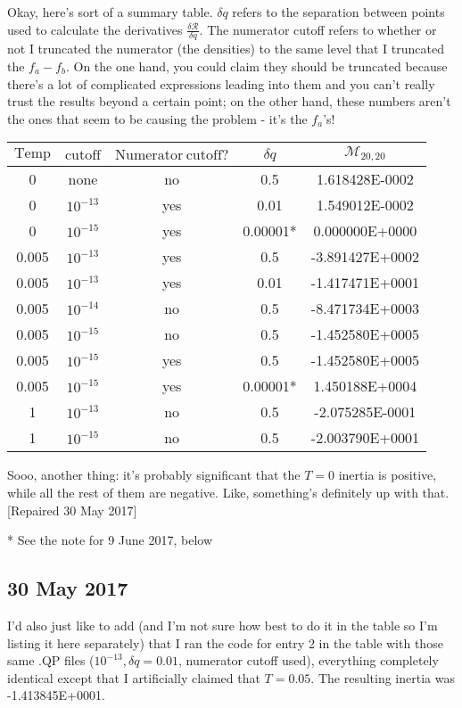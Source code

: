 Okay, here's sort of a summary table. $\delta q$ refers to the separation between points used to calculate the derivatives $\frac{\delta \mathcal{R}}{\delta q}$. The numerator cutoff refers to whether or not I truncated the numerator (the densities) to the same level that I truncated the $f_a-f_b$. On the one hand, you could claim they should be truncated because there's a lot of complicated expressions leading into them and you can't really trust the results beyond a certain point; on the other hand, these numbers aren't the ones that seem to be causing the problem - it's the $f_a$'s!

\begin{tabular}{|c|c|c|c|c|}
\hline
$\mathrm{Temp}$ & $\mathrm{cutoff}$ & $\mathrm{Numerator\ cutoff?}$ & $\delta q$ & $\mathcal{M}_{20,20}$ \\ \hline\hline
0      &  none       & no   & 0.5  &  1.618428E-0002  \\\hline
0      &  $10^{-13}$   & yes  & 0.01 &  1.549012E-0002  \\\hline
0      &  $10^{-15}$   & yes  & 0.00001* &  0.000000E+0000  \\\hline
0.005  &  $10^{-13}$   & yes  & 0.5  & -3.891427E+0002  \\\hline
0.005  &  $10^{-13}$   & yes  & 0.01 & -1.417471E+0001  \\\hline
0.005  &  $10^{-14}$   & no   & 0.5  & -8.471734E+0003  \\\hline
0.005  &  $10^{-15}$   & no   & 0.5  & -1.452580E+0005  \\\hline
0.005  &  $10^{-15}$   & yes  & 0.5  & -1.452580E+0005  \\\hline
0.005  &  $10^{-15}$   & yes  & 0.00001*  & 1.450188E+0004  \\\hline
1      &  $10^{-13}$   & no   & 0.5  & -2.075285E-0001  \\\hline
1      &  $10^{-15}$   & no   & 0.5  & -2.003790E+0001  \\\hline
\end{tabular}

Sooo, another thing: it's probably significant that the $T=0$ inertia is positive, while all the rest of them are negative. Like, something's definitely up with that. [Repaired 30 May 2017]

* See the note for 9 June 2017, below

\subsection*{30 May 2017}
I'd also just like to add (and I'm not sure how best to do it in the table so I'm listing it here separately) that I ran the code for entry 2 in the table with those same .QP files ($10^{-13}, \delta q=0.01$, numerator cutoff used), everything completely identical except that I artificially claimed that $T=0.05$. The resulting inertia was -1.413845E+0001.

